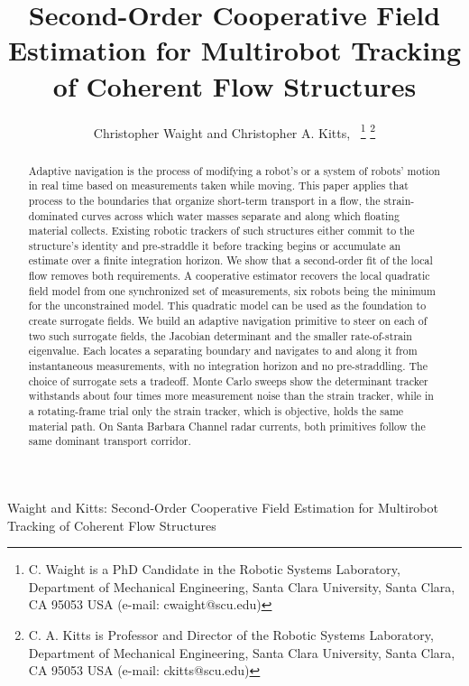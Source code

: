 \documentclass[lettersize,journal]{IEEEtran}
\begin{document}
\title{Second-Order Cooperative Field Estimation for
Multirobot Tracking of Coherent Flow Structures}

\author{Christopher Waight and Christopher A. Kitts,~
\thanks{C. Waight is a PhD Candidate in the Robotic Systems Laboratory, Department of Mechanical Engineering, Santa Clara University, Santa Clara, CA 95053 USA (e-mail: cwaight@scu.edu)}
\thanks{C. A. Kitts is Professor and Director of the Robotic Systems Laboratory, Department of Mechanical Engineering, Santa Clara University, Santa Clara, CA 95053 USA (e-mail: ckitts@scu.edu)}
}
%
{Waight and Kitts: Second-Order Cooperative Field Estimation for Multirobot Tracking of Coherent Flow Structures}

\maketitle

\begin{abstract}
Adaptive navigation is the process of modifying a robot's or a system of robots' motion in
real time based on measurements taken while moving. This paper applies
that process to the boundaries that organize short-term transport in a
flow, the strain-dominated curves across which water masses separate
and along which floating material collects. Existing robotic trackers
of such structures either commit to the structure's identity and pre-straddle it before
tracking begins or accumulate an estimate over a finite integration
horizon. We show that a second-order fit of the local flow removes both
requirements. A cooperative estimator recovers the local quadratic field
model from one synchronized set of measurements, six robots being the minimum
for the unconstrained model. This quadratic model can be used as the foundation to create surrogate
fields. We build an adaptive navigation primitive to steer on each of two
such surrogate fields, the Jacobian determinant and the smaller
rate-of-strain eigenvalue. Each locates a separating boundary and navigates to and along
it from instantaneous measurements, with no integration horizon and no
pre-straddling. The choice of surrogate sets a tradeoff. Monte Carlo
sweeps show the determinant tracker withstands about four times
more measurement noise than the strain tracker, while in a rotating-frame trial only the strain
tracker, which is objective, holds the same material path. On Santa
Barbara Channel radar currents, both primitives follow the same dominant
transport corridor.

\end{abstract}
\end{document}
